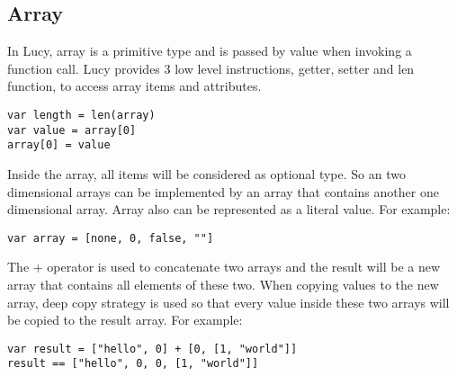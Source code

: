 \subsection{Array}
In Lucy, array is a primitive type and is passed by value when invoking a function call. Lucy provides 3 low level instructions, getter, setter and len function, to access array items and attributes.
\begin{lstlisting}
var length = len(array)
var value = array[0]
array[0] = value
\end{lstlisting}
Inside the array, all items will be considered as optional type. So an two dimensional arrays can be implemented by an array that contains another one dimensional array. Array also can be represented as a literal value. For example:
\begin{lstlisting}
var array = [none, 0, false, ""]
\end{lstlisting}
The + operator is used to concatenate two arrays and the result will be a new array that contains all elements of these two. When copying values to the new array, deep copy strategy is used so that every value inside these two arrays will be copied to the result array. For example:
\begin{lstlisting}
var result = ["hello", 0] + [0, [1, "world"]]
result == ["hello", 0, 0, [1, "world"]]
\end{lstlisting}

